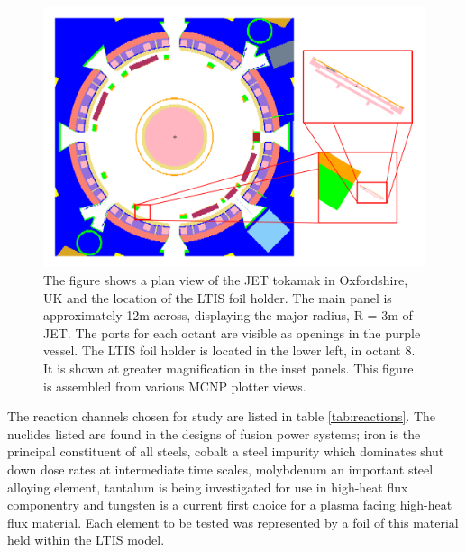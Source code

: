 \begin{figure}[H]
  \centering
  \includegraphics[width=\linewidth]{jet_mcnp_inset}
  \caption{The figure shows a plan view of the JET tokamak in Oxfordshire, UK and the location of the LTIS foil holder. The main panel is approximately 12m across, displaying the major radius, R = 3m of JET. The ports for each octant are visible as openings in the purple vessel. The LTIS foil holder is located in the lower left, in octant 8. It is shown at greater magnification in the inset panels. This figure is assembled from various MCNP plotter views.}
  \label{fig:jet_mcnp}
\end{figure}

The reaction channels chosen for study are listed in table \ref{tab:reactions}. The nuclides listed are found in the designs of fusion power systems; iron is the principal constituent of all steels, cobalt a steel impurity which dominates shut down dose rates at intermediate time scales, molybdenum an important steel alloying element, tantalum is being investigated for use in high-heat flux componentry and tungsten is a current first choice for a plasma facing high-heat flux material. Each element to be tested was represented by a foil of this material held within the LTIS model.

